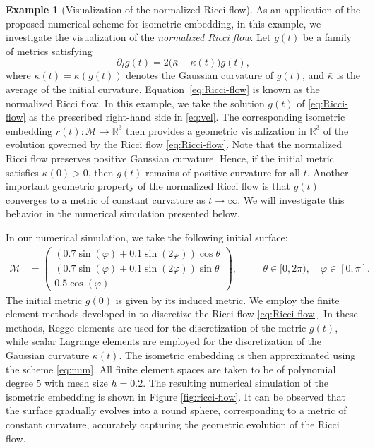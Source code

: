\documentclass[11pt,a4paper,oneside,reqno]{amsart}
\theoremstyle{definition}
\newtheorem{example}{Example}[section]
\theoremstyle{plain}
\numberwithin{theorem}{section}
\numberwithin{proposition}{section}
\numberwithin{lemma}{section}
\numberwithin{equation}{section}
\newcommand{\Man}{\mathcal{M}}
\begin{document}
\begin{example}[Visualization of the normalized Ricci flow]
As an application of the proposed numerical scheme for isometric embedding, in this example, we investigate the visualization of the \emph{normalized Ricci flow}. 
Let \( g(t) \) be a family of metrics satisfying
\begin{equation}\label{eq:Ricci-flow}
    \partial_t g(t) = 2 \big( \bar{\kappa} - \kappa(t) \big) g(t),
\end{equation}
where \( \kappa(t) = \kappa(g(t)) \) denotes the Gaussian curvature of \( g(t) \), and 
\( \bar{\kappa} \) is the average of the initial curvature. 
Equation~\eqref{eq:Ricci-flow} is known as the normalized Ricci flow. 
In this example, we take the solution \( g(t) \) of \eqref{eq:Ricci-flow} as the prescribed right-hand side in \eqref{eq:vel}. 
The corresponding isometric embedding 
\( r(t): \Man \to \mathbb{R}^3 \) then provides a geometric visualization in \( \mathbb{R}^3 \) 
of the evolution governed by the Ricci flow \eqref{eq:Ricci-flow}. 
Note that the normalized Ricci flow preserves positive Gaussian curvature. 
Hence, if the initial metric satisfies \( \kappa(0) > 0 \), then \( g(t) \) remains of positive curvature for all \( t \). 
Another important geometric property of the normalized Ricci flow is that 
\( g(t) \) converges to a metric of constant curvature as \( t \to \infty \). 
We will investigate this behavior in the numerical simulation presented below.

In our numerical simulation, we take the following initial surface:
\begin{equation}
\begin{aligned}
    \Man &= \left( \begin{array}{c}
        (0.7\sin (\varphi)+0.1\sin(2\varphi)) \cos \theta \\[5pt]
        (0.7\sin (\varphi)+0.1\sin(2\varphi)) \sin \theta \\[5pt]
        0.5\cos (\varphi)
    \end{array} \right),
    \quad &&\theta \in [0, 2\pi), \quad \varphi \in [0, \pi]. 
\end{aligned}
\end{equation}
The initial metric \( g(0) \) is given by its induced metric.
We employ the finite element methods developed in \cite{gao2025ricci,gawlik2019finite} to discretize the Ricci flow \eqref{eq:Ricci-flow}. In these methods, Regge elements are used for the discretization of the metric \( g(t) \), while scalar Lagrange elements are employed for the discretization of the Gaussian curvature \( \kappa(t) \). The isometric embedding is then approximated using the scheme \eqref{eq:num}. All finite element spaces are taken to be of polynomial degree \( 5 \) with mesh size \( h = 0.2 \). The resulting numerical simulation of the isometric embedding is shown in Figure \ref{fig:ricci-flow}. It can be observed that the surface gradually evolves into a round sphere, corresponding to a metric of constant curvature, accurately capturing the geometric evolution of the Ricci flow.


\end{example}
\end{document}
